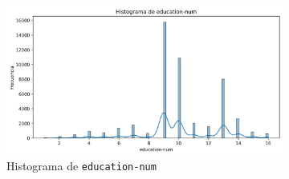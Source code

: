 \documentclass[12pt,a4paper]{article}
\begin{document}
\begin{enumerate}
    \begin{figure}[H]
      \centering
      \begin{subfigure}[b]{0.45\textwidth}
        \includegraphics[width=\textwidth]{histogram_education-num.png}
        \caption{Histograma de \texttt{education-num}}
        \label{fig:education_num_hist}
      \end{subfigure}
      \hfill
      \begin{subfigure}[b]{0.45\textwidth}

\end{subfigure}
\end{figure}
\end{enumerate}
\end{document}
